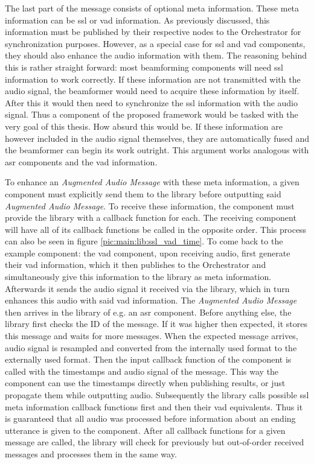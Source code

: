 The last part of the message consists of optional meta information.
These meta information can be \gls{ssl} or \gls{vad} information.
As previously discussed, this information must be published by their respective nodes to the Orchestrator for synchronization purposes.
However, as a special case for \gls{ssl} and \gls{vad} components, they should also enhance the audio information with them.
The reasoning behind this is rather straight forward:
most beamforming components will need \gls{ssl} information to work correctly.
If these information are not transmitted with the audio signal, the beamformer would need to acquire these information by itself.
After this it would then need to synchronize the \gls{ssl} information with the audio signal.
Thus a component of the proposed framework would be tasked with the very goal of this thesis.
How absurd this would be.
If these information are however included in the audio signal themselves, they are automatically fused and the beamformer can begin its work outright.
This argument works analogous with \gls{asr} components and the \gls{vad} information.

To enhance an \textit{Augmented Audio Message} with these meta information, a given component must explicitly send them to the library before outputting said \textit{Augmented Audio Message}.
To receive these information, the component must provide the library with a callback function for each.
The receiving component will have all of its callback functions be called in the opposite order.
This process can also be seen in figure \ref{pic:main:lib:ssl_vad_time}.
To come back to the example component:
the \gls{vad} component, upon receiving audio, first generate their \gls{vad} information, which it then publishes to the Orchestrator and simultaneously give this information to the library as meta information.
Afterwards it sends the audio signal it received via the library, which in turn enhances this audio with said \gls{vad} information.
The \textit{Augmented Audio Message} then arrives in the library of e.g. an \gls{asr} component.
Before anything else, the library first checks the ID of the message.
If it was higher then expected, it stores this message and waits for more messages.
When the expected message arrives, audio signal is resampled and converted from the internally used format to the externally used format.
Then the input callback function of the component is called with the timestamps and audio signal of the message.
This way the component can use the timestamps directly when publishing results, or just propagate them while outputting audio.
Subsequently the library calls possible \gls{ssl} meta information callback functions first and then their \gls{vad} equivalents.
Thus it is guaranteed that all audio was processed before information about an ending utterance is given to the component. 
After all callback functions for a given message are called, the library will check for previously but out-of-order received messages and processes them in the same way.



